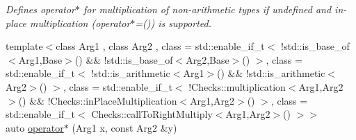 \begin{DoxyCompactItemize}
\begin{DoxyCompactList}\small\item\em Defines operator$\ast$ for multiplication of non-\/arithmetic types if undefined and in-\/place multiplication (operator$\ast$=()) is supported. \end{DoxyCompactList}\item 
\hypertarget{namespaceFunG_a6e4d3266e119cd102800bf5c091e57fd}{{\footnotesize template$<$class Arg1 , class Arg2 , class  = std\-::enable\-\_\-if\-\_\-t$<$ !std\-::is\-\_\-base\-\_\-of$<$\-Arg1,\-Base$>$() \&\& !std\-::is\-\_\-base\-\_\-of$<$\-Arg2,\-Base$>$() $>$, class  = std\-::enable\-\_\-if\-\_\-t$<$ !std\-::is\-\_\-arithmetic$<$\-Arg1$>$() \&\& !std\-::is\-\_\-arithmetic$<$\-Arg2$>$() $>$, class  = std\-::enable\-\_\-if\-\_\-t$<$ !\-Checks\-::multiplication$<$\-Arg1,\-Arg2$>$() \&\&                                       !\-Checks\-::in\-Place\-Multiplication$<$\-Arg1,\-Arg2$>$() $>$, class  = std\-::enable\-\_\-if\-\_\-t$<$ Checks\-::call\-To\-Right\-Multiply$<$\-Arg1,\-Arg2$>$() $>$$>$ }\\auto \hyperlink{namespaceFunG_a6e4d3266e119cd102800bf5c091e57fd}{operator$\ast$} (Arg1 x, const Arg2 \&y)}\label{namespaceFunG_a6e4d3266e119cd102800bf5c091e57fd}


\end{DoxyCompactItemize}
